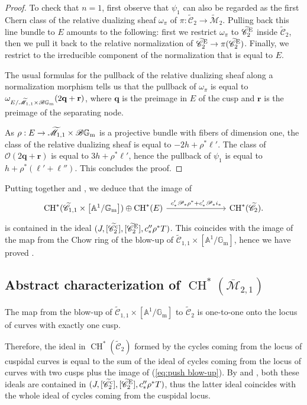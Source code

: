\documentclass[a4paper, 10pt]{amsart}
\numberwithin{equation}{section}
\numberwithin{subsection}{section}
\theoremstyle{definition}
\theoremstyle{remark}
\renewcommand{\mathcal}{\mathscr}
\newcommand\cM{\mathcal{M}} \newcommand\cN{\mathcal{N}}
\newcommand\cO{\mathcal{O}} \newcommand\cP{\mathcal{P}}
\renewcommand\AA{\mathbb{A}} \newcommand\BB{\mathbb{B}}
\newcommand\GG{\mathbb{G}} \newcommand\HH{\mathbb{H}}
\newcommand\rmm{\mathrm{m}} \newcommand\rmn{\mathrm{n}}
\newcommand\bfq{\mathbf{q}} \newcommand\bfr{\mathbf{r}}
\newcommand{\gm}{\GG_{\rmm}}
\newcommand{\Mbar}{\overline{\cM}}
\newcommand{\Mtilde}{\widetilde{\mathcal M}}
\newcommand{\Ctilde}{\widetilde{\mathcal C}}
\newcommand{\ag}{[\AA^{1}/\gm]}
\newcommand{\ch}[1][*]{\operatorname{CH}^{#1}}
\begin{document}
\begin{proof}
		To check that $n=1$, first observe that $\psi_1$ can also be regarded as the first Chern class of the relative dualizing sheaf $\omega_{\pi}$ of $\pi\colon\Ctilde_2\to\Mtilde_2$. Pulling back this line bundle to $E$ amounts to the following: first we restrict $\omega_{\pi}$ to $\Ctilde_2^{\rm E}$ inside $\Ctilde_2$, then we pull it back to the relative normalization of $\Ctilde_2^{\rm E}\to \pi(\Ctilde_2^{\rm E})$. Finally, we restrict to the irreducible component of the normalization that is equal to $E$.
		
		The usual formulas for the pullback of the relative dualizing sheaf along a normalization morphism tells us that the pullback of $\omega_{\pi}$ is equal to $\omega_{E/\Mtilde_{1,1}\times\cB\gm}(2\bfq + \bfr)$, where $\bfq$ is the preimage in $E$ of the cusp and $\bfr$ is the preimage of the separating node.
		
		As $\rho:E\to\Mtilde_{1,1}\times\cB\gm$ is a projective bundle with fibers of dimension one, the class of the relative dualizing sheaf is equal to $-2h+\rho^*\ell'$. The class of $\cO(2\bfq + \bfr)$ is equal to $3h + \rho^*\ell'$, hence the pullback of $\psi_1$ is equal to $h+\rho^*(\ell' + \ell'')$. This concludes the proof.
	\end{proof}
	Putting together  and , we deduce that the image of
	\begin{equation}\label{eq:push blow-up}
		\begin{tikzcd}
			\ch(\Ctilde_{1,1}\times \left[\AA^1/\gm\right])\oplus\ch(E) \ar[rrr, "c'_*\cP_*\rho^* + c'_*\cP_*i_*"] & & & \ch(\Ctilde_2).
		\end{tikzcd}
	\end{equation}
	is contained in the ideal $(J,[\Ctilde_2^{\rm c}],[\Ctilde_2^{\rm E}],c''_*\rho^*T)$. This coincides with the image of the map from the Chow ring of the blow-up of $\Ctilde_{1,1}\times \ag$, hence we have proved .
	
	\subsection{Abstract characterization of $\ch(\Mbar_{2,1})$}
	The map from the blow-up of $\Ctilde_{1,1}\times[\AA^1/\gm]$ to $\Ctilde_2$ is one-to-one onto the locus of curves with exactly one cusp.
	
	Therefore, the ideal in $\ch(\Ctilde_2)$ formed by the cycles coming from the locus of cuspidal curves is equal to the sum of the ideal of cycles coming from the locus of curves with two cusps plus the image of (\ref{eq:push blow-up}). By  and , both these ideals are contained in $(J,[\Ctilde_{2}^{\rm c}],[\Ctilde_2^{\rm E}],c''_*\rho^*T)$, thus the latter ideal coincides with the whole ideal of cycles coming from the cuspidal locus. 
	
\end{document}
